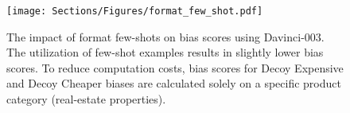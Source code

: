 \begin{figure}[t!]
\centering
\texttt{[image: Sections/Figures/format\_few\_shot.pdf]}
\caption{The impact of format few-shots on bias scores using Davinci-003. The utilization of few-shot examples results in slightly lower bias scores. To reduce computation costs, bias scores for Decoy Expensive and Decoy Cheaper biases are calculated solely on a specific product category (real-estate properties).}
\label{fig:format_few_shot}
\end{figure}
